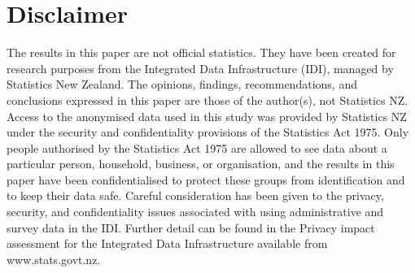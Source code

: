 \section{Disclaimer}
The results in this paper are not official statistics. They have been created for research purposes from the Integrated Data Infrastructure (IDI), managed by Statistics New Zealand. The opinions, findings, recommendations, and conclusions expressed in this paper are those of the author(s), not Statistics NZ. Access to the anonymised data used in this study was provided by Statistics NZ under the security and confidentiality provisions of the Statistics Act 1975. Only people authorised by the Statistics Act 1975 are allowed to see data about a particular person, household, business, or organisation, and the results in this paper have been confidentialised to protect these groups from identification and to keep their data safe. Careful consideration has been given to the privacy, security, and confidentiality issues associated with using administrative and survey data in the IDI. Further detail can be found in the Privacy impact assessment for the Integrated Data Infrastructure available from www.stats.govt.nz. 
